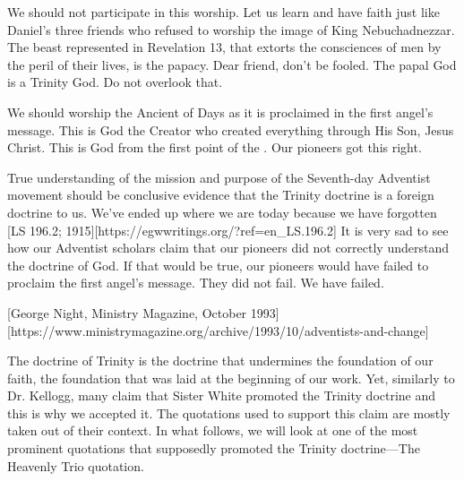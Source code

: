 We should not participate in this worship. Let us learn and have faith just like Daniel’s three friends who refused to worship the image of King Nebuchadnezzar. The beast represented in Revelation 13, that extorts the consciences of men by the peril of their lives, is the papacy. Dear friend, don't be fooled. The papal God is a Trinity God. Do not overlook that. 

We should worship the Ancient of Days as it is proclaimed in the first angel’s message. This is God the Creator who created everything through His Son, Jesus Christ. This is God from the first point of the . Our pioneers got this right. 

True understanding of the mission and purpose of the Seventh-day Adventist movement should be conclusive evidence that the Trinity doctrine is a foreign doctrine to us. We’ve ended up where we are today because we have forgotten [LS 196.2; 1915][https://egwwritings.org/?ref=en\_LS.196.2] It is very sad to see how our Adventist scholars claim that our pioneers did not correctly understand the doctrine of God. If that would be true, our pioneers would have failed to proclaim the first angel’s message. They did not fail. We have failed.

[George Night, Ministry Magazine, October 1993][https://www.ministrymagazine.org/archive/1993/10/adventists-and-change]

The doctrine of Trinity is the doctrine that undermines the foundation of our faith, the foundation that was laid at the beginning of our work. Yet, similarly to Dr. Kellogg, many claim that Sister White promoted the Trinity doctrine and this is why we accepted it. The quotations used to support this claim are mostly taken out of their context. In what follows, we will look at one of the most prominent quotations that supposedly promoted the Trinity doctrine—The Heavenly Trio quotation.

